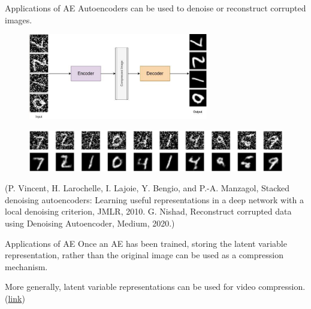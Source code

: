 \begin{frame}[allowframebreaks]

\begin{myconceptblock}{9.4}{Applications of AE}
    Autoencoders can be used to denoise or reconstruct corrupted images.

    \begin{figure}[H]
        \centering
        \includegraphics[width=0.7\textwidth]{.././assets/9.2.png}
    \end{figure}

    \begin{figure}[H]
        \centering
        \includegraphics[width=1.0\textwidth]{.././assets/9.3.png}
    \end{figure}

    (P. Vincent, H. Larochelle, I. Lajoie, Y. Bengio, and P.-A. Manzagol, Stacked denoising autoencoders: Learning useful representations in a deep network with a local denoising criterion, JMLR, 2010.
    G. Nishad, Reconstruct corrupted data using Denoising Autoencoder, Medium, 2020.)
\end{myconceptblock}

\end{frame}

\begin{frame}[allowframebreaks]

\begin{myconceptblock}{9.5}{Applications of AE}
    Once an AE has been trained, storing the latent variable representation, rather than the original image can be used as a compression mechanism.

    More generally, latent variable representations can be used for video compression.
    (\href{https://youtu.be/NqmMnjJ6GEg}{link})
\end{myconceptblock}

\end{frame}


